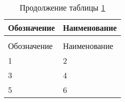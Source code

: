 \begin{longtable}{|p{60mm}|p{100mm}|}
  \caption{Простая} \label{appendix_signature:t:1} \\
  \hline
  \multicolumn{1}{|p{60mm}|}{\centering Обозначение} &
  \multicolumn{1}{p{100mm}|}{\centering Наименование} \\\hline
  \endfirsthead
  \caption*{Продолжение таблицы \ref{appendix_signature:t:1}} \\
 \hline
  \multicolumn{1}{|p{60mm}|}{\centering Обозначение} &
  \multicolumn{1}{p{100mm}|}{\centering Наименование} \\\hline
  \endhead
   1    &   2   \\ \hline
   3    &   4   \\ \hline
   5    &   6   \\ \hline
\end{longtable}

